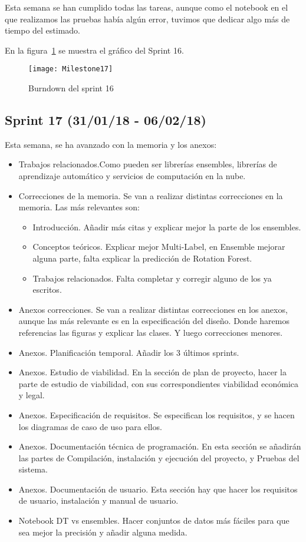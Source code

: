 Esta semana se han cumplido todas las tareas, aunque como el notebook en el que realizamos las pruebas había algún error, tuvimos que dedicar algo más de tiempo del estimado.

En la figura~\ref{fig:Milestone17} se muestra el gráfico del Sprint 16.

\begin{figure}
\centering
\texttt{[image: Milestone17]}
\caption{Burndown del sprint 16}
\label{fig:Milestone17}
\end{figure}

\subsection{Sprint 17 (31/01/18 - 06/02/18)}
Esta semana, se ha avanzado con la memoria y los anexos:
\begin{itemize}
\item Trabajos relacionados.Como pueden ser librerías ensembles, librerías de aprendizaje automático y servicios de computación en la nube.
\item Correcciones de la memoria. Se van a realizar distintas correcciones en la memoria. Las más relevantes son:
\begin{itemize}
	\item Introducción. Añadir más citas y explicar mejor la parte de los ensembles.
	\item Conceptos teóricos. Explicar mejor Multi-Label, en Ensemble mejorar alguna parte, falta explicar la predicción de Rotation Forest.
	\item Trabajos relacionados. Falta completar y corregir alguno de los ya escritos.
\end{itemize}
\item Anexos correcciones. Se van a realizar distintas correcciones en los anexos, aunque las más relevante es en la especificación del diseño. Donde haremos referencias las figuras y explicar las clases. Y luego correcciones menores.
\item Anexos. Planificación temporal. Añadir los 3 últimos sprints.
\item Anexos. Estudio de viabilidad. En la sección de plan de proyecto, hacer la parte de estudio de viabilidad, con sus correspondientes viabilidad económica y legal.
\item Anexos. Especificación de requisitos. Se especifican los requisitos, y se hacen los diagramas de caso de uso para ellos.
\item Anexos. Documentación técnica de programación. En esta sección se añadirán las partes de Compilación, instalación y ejecución del proyecto, y Pruebas del sistema.
\item Anexos. Documentación de usuario. Esta sección hay que hacer los requisitos de usuario, instalación y manual de usuario.
\item Notebook DT vs ensembles. Hacer conjuntos de datos más fáciles para que sea mejor la precisión y añadir alguna medida.
\end{itemize}

